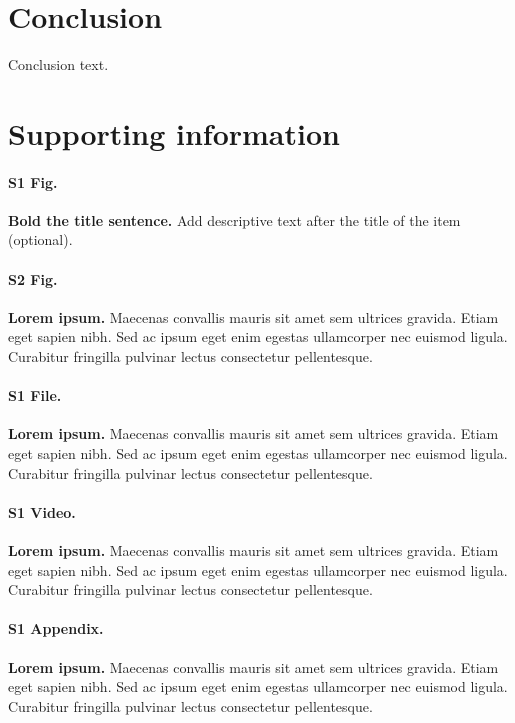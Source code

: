 \documentclass[10pt,letterpaper]{article}
\begin{document}
\section*{Conclusion}

Conclusion text. 

\section*{Supporting information}

\paragraph*{S1 Fig.}
\label{S1_Fig}
{\bf Bold the title sentence.} Add descriptive text after the title of the item (optional).

\paragraph*{S2 Fig.}
\label{S2_Fig}
{\bf Lorem ipsum.} Maecenas convallis mauris sit amet sem ultrices gravida. Etiam eget sapien nibh. Sed ac ipsum eget enim egestas ullamcorper nec euismod ligula. Curabitur fringilla pulvinar lectus consectetur pellentesque.

\paragraph*{S1 File.}
\label{S1_File}
{\bf Lorem ipsum.}  Maecenas convallis mauris sit amet sem ultrices gravida. Etiam eget sapien nibh. Sed ac ipsum eget enim egestas ullamcorper nec euismod ligula. Curabitur fringilla pulvinar lectus consectetur pellentesque.

\paragraph*{S1 Video.}
\label{S1_Video}
{\bf Lorem ipsum.}  Maecenas convallis mauris sit amet sem ultrices gravida. Etiam eget sapien nibh. Sed ac ipsum eget enim egestas ullamcorper nec euismod ligula. Curabitur fringilla pulvinar lectus consectetur pellentesque.

\paragraph*{S1 Appendix.}
\label{S1_Appendix}
{\bf Lorem ipsum.} Maecenas convallis mauris sit amet sem ultrices gravida. Etiam eget sapien nibh. Sed ac ipsum eget enim egestas ullamcorper nec euismod ligula. Curabitur fringilla pulvinar lectus consectetur pellentesque.
\end{document}
